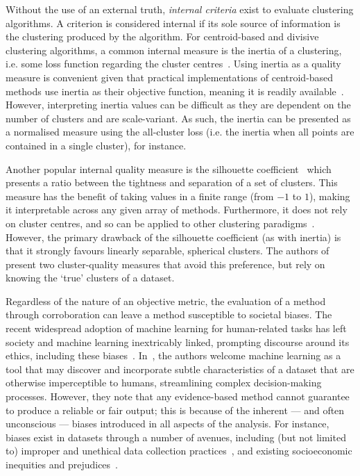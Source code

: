 Without the use of an external truth, \emph{internal criteria} exist to evaluate
clustering algorithms. A criterion is considered internal if its sole source of
information is the clustering produced by the algorithm. For centroid-based and
divisive clustering algorithms, a common internal measure is the inertia of a
clustering, i.e. some loss function regarding the cluster
centres~\cite{Everitt2011}. Using inertia as a quality measure is convenient
given that practical implementations of centroid-based methods use inertia as
their objective function, meaning it is readily available~\cite{scikit-learn}.
However, interpreting inertia values can be difficult as they are dependent on
the number of clusters and are scale-variant. As such, the inertia can be
presented as a normalised measure using the all-cluster loss (i.e. the inertia
when all points are contained in a single cluster), for instance.

Another popular internal quality measure is the silhouette
coefficient~\cite{Rousseeuw1987} which presents a ratio between the tightness
and separation of a set of clusters. This measure has the benefit of taking
values in a finite range (from \(-1\) to \(1\)), making it interpretable across
any given array of methods. Furthermore, it does not rely on cluster centres,
and so can be applied to other clustering
paradigms~\cite{Garcia2011,Guan2019,Starczewski2015}. However, the primary
drawback of the silhouette coefficient (as with inertia) is that it strongly
favours linearly separable, spherical clusters. The authors
of~\cite{Frederix2004} present two cluster-quality measures that avoid this
preference, but rely on knowing the `true' clusters of a dataset.

Regardless of the nature of an objective metric, the evaluation of a method
through corroboration can leave a method susceptible to societal biases. The
recent widespread adoption of machine learning for human-related tasks has left
society and machine learning inextricably linked, prompting discourse around its
ethics, including these
biases~\cite{Barocas2019,Grote2020,Mehrabi2019,Obermeyer2019,Saltz2019}.
In~\cite{Barocas2019}, the authors welcome machine learning as a tool that may
discover and incorporate subtle characteristics of a dataset that are otherwise
imperceptible to humans, streamlining complex decision-making processes.
However, they note that any evidence-based method cannot guarantee to produce a
reliable or fair output; this is because of the inherent --- and often
unconscious --- biases introduced in all aspects of the analysis. For instance,
biases exist in datasets through a number of avenues, including (but not limited
to) improper and unethical data collection practices~\cite{Prabhu2020}, and
existing socioeconomic inequities and
prejudices~\cite{Crawford2013,Rangvid2019}.

